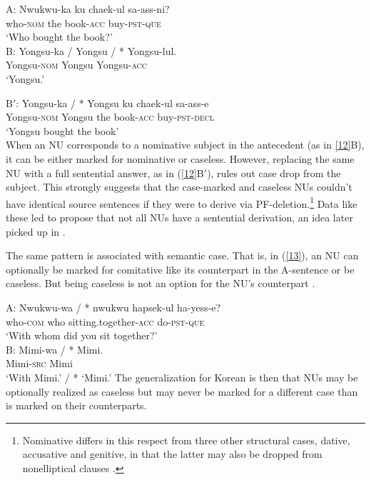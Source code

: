 \documentclass[output=paper
	        ,collection
	        ,collectionchapter
 	        ,biblatex
                ,babelshorthands
                ,newtxmath
                ,draftmode
                ,colorlinks, citecolor=brown
]{langscibook}
\begin{document}
{  \ea
A: \gll Nwukwu-ka        ku  chaek-ul          sa-ass-ni?\\
        who-\textsc{nom} the book-\textsc{acc} buy-\textsc{pst}-\textsc{que}\\
\glt  `Who bought the book?'\\

B: \gll Yongsu-ka / Yongsu / * Yongsu-lul.\\
        Yongsu-\textsc{nom} {} Yongsu {} {} Yongsu-\textsc{acc}\\
\glt  `Yongsu.'

B$'$: \gll Yongsu-ka            /  *  Yongsu ku  chaek-ul          sa-ass-e\\
           Yongsu-\textsc{nom}  {} {} Yongsu the book-\textsc{acc} buy-\textsc{pst}-\textsc{decl}\\
\glt  `Yongsu bought the book'\\
\label{12}
\z
%
When an NU corresponds to a nominative subject in the antecedent (as in \ref{12}B), it can be either marked for nominative or caseless.
However, replacing the same NU with a full sentential answer, as in (\ref{12}B$'$), rules out case drop from the subject. This strongly suggests that the case-marked and caseless NUs couldn't have identical source sentences if they were to derive via PF-deletion.\footnote{Nominative differs in this respect from three other structural cases, dative, accusative and genitive, in that the latter may also be dropped from nonelliptical clauses \citep[see][]{Morgan1989, Lee2016, Kim2016}.}  Data like these led \citet{Morgan1989} to propose that not all NUs have a sentential derivation, an idea later picked up in \citet{Barton1998}.

The same pattern is associated with semantic case. That is, in (\ref{13}), an NU can optionally be
marked for comitative like its counterpart in the A-sentence or be caseless. But being caseless is not an option for the NU's counterpart \citep{Kim2015}.

\ea
A:
\gll Nwukwu-wa         /  *  nwukwu  hapsek-ul                     ha-yess-e?\\
     who-\textsc{com}  {} {} who     sitting.together-\textsc{acc} do-\textsc{pst}-\textsc{que}\\
\glt  `With whom did you sit together?'\\

B:
\gll Mimi-wa / * Mimi.\\
     Mimi-\textsc{src} {} {} Mimi\\
\glt `With Mimi.' / * `Mimi.' \label{13}\z
%
The generalization for Korean is then that NUs may be optionally realized as caseless but may never be marked for a different case than is marked on their counterparts.

}
\end{document}
